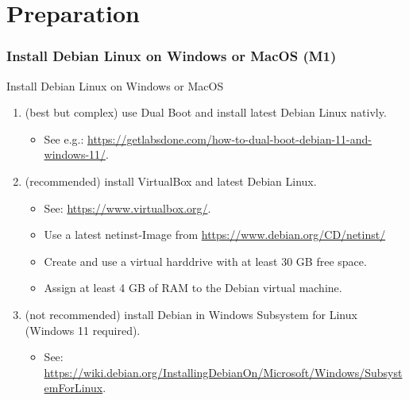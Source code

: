 \part{Preparation}
\section{Install Debian Linux on Windows or MacOS (M1)}

\begin{frame}{Install Debian Linux on Windows or MacOS}
  \begin{enumerate}
    \item[Either] (best but complex) use \textcolor{fh-ooe-red}{Dual Boot} and install \textcolor{fh-ooe-red}{latest Debian} Linux \textcolor{fh-ooe-red}{nativly}.
    \begin{itemize}
      \item See e.g.: \textcolor{fh-ooe-red}{\href{https://getlabsdone.com/how-to-dual-boot-debian-11-and-windows-11/}{https://getlabsdone.com/how-to-dual-boot-debian-11-and-windows-11/}}.
    \end{itemize}
    \item[Or] (recommended) install \textcolor{fh-ooe-red}{VirtualBox} and \textcolor{fh-ooe-red}{latest Debian} Linux.
    \begin{itemize}
      \item See: \textcolor{fh-ooe-red}{\href{https://www.virtualbox.org/}{https://www.virtualbox.org/}}.
      \item Use a latest \textcolor{fh-ooe-red}{netinst-Image} from \textcolor{fh-ooe-red}{\href{https://www.debian.org/CD/netinst/}{https://www.debian.org/CD/netinst/}}
      \item Create and use a virtual harddrive with at least \textcolor{fh-ooe-red}{30 GB} free space.
      \item Assign at least \textcolor{fh-ooe-red}{4 GB} of \textcolor{fh-ooe-red}{RAM} to the \textcolor{fh-ooe-red}{Debian virtual machine}.
    \end{itemize}
    \item[Or] (not recommended) install Debian in Windows Subsystem for Linux (Windows 11 required).
    \begin{itemize}
      \item See: \textcolor{fh-ooe-red}{\href{https://wiki.debian.org/InstallingDebianOn/Microsoft/Windows/SubsystemForLinux}{https://wiki.debian.org/InstallingDebianOn/Microsoft/Windows/SubsystemForLinux}}.
    \end{itemize}

\end{enumerate}
\end{frame}
